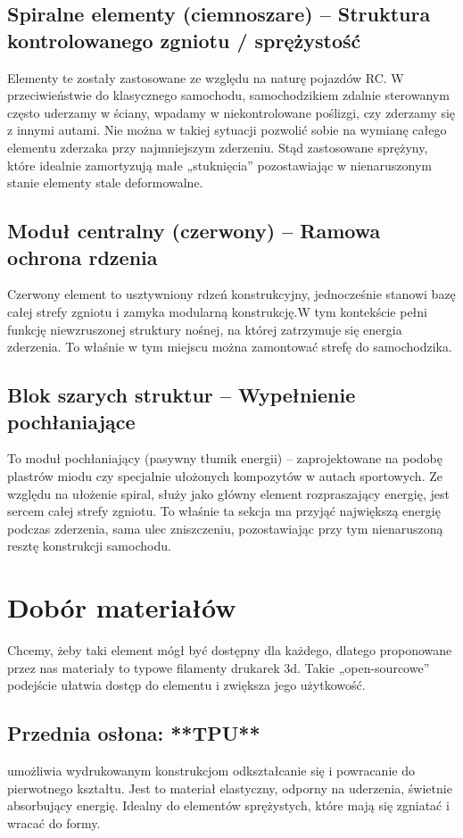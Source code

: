 \documentclass[a4paper,12pt]{article}  %
\begin{document}
\subsection{Spiralne elementy (ciemnoszare) – Struktura kontrolowanego zgniotu /
sprężystość}
Elementy te zostały zastosowane ze względu na naturę pojazdów RC. W przeciwieństwie do
klasycznego samochodu, samochodzikiem zdalnie sterowanym często uderzamy w ściany,
wpadamy w niekontrolowane poślizgi, czy zderzamy się z innymi autami. Nie można w takiej
sytuacji pozwolić sobie na wymianę całego elementu zderzaka przy najmniejszym zderzeniu. Stąd
zastosowane sprężyny, które idealnie zamortyzują małe „stuknięcia” pozostawiając w
nienaruszonym stanie elementy stale deformowalne.

\subsection{Moduł centralny (czerwony) – Ramowa ochrona rdzenia}
Czerwony element to usztywniony rdzeń konstrukcyjny, jednocześnie stanowi bazę całej strefy
zgniotu i zamyka modularną konstrukcję.W tym kontekście pełni funkcję niewzruszonej struktury
nośnej, na której zatrzymuje się energia zderzenia. To właśnie w tym miejscu można zamontować
strefę do samochodzika.

\subsection{Blok szarych struktur – Wypełnienie pochłaniające}
To moduł pochłaniający (pasywny tłumik energii) – zaprojektowane na podobę plastrów miodu czy
specjalnie ułożonych kompozytów w autach sportowych. Ze względu na ułożenie spiral, służy
jako główny element rozpraszający energię, jest sercem całej strefy zgniotu. To właśnie ta sekcja
ma przyjąć największą energię podczas zderzenia, sama ulec zniszczeniu, pozostawiając przy tym
nienaruszoną resztę konstrukcji samochodu.

\section{Dobór materiałów}

Chcemy, żeby taki element mógł być dostępny dla każdego, dlatego proponowane przez nas
materiały to typowe filamenty drukarek 3d. Takie „open-sourcowe” podejście ułatwia dostęp do
elementu i zwiększa jego użytkowość.

\subsection{Przednia osłona: **TPU**}
umożliwia wydrukowanym konstrukcjom odkształcanie się i
powracanie do pierwotnego kształtu. Jest to materiał elastyczny, odporny na uderzenia,
świetnie absorbujący energię. Idealny do elementów sprężystych, które mają się zgniatać i
wracać do formy.
\end{document}
